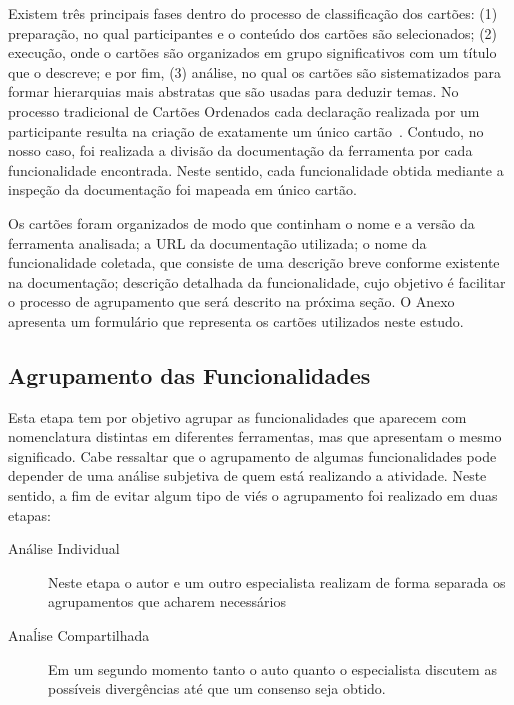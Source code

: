 Existem três principais fases dentro do processo de classificação dos cartões:
(1) preparação, no qual participantes e o conteúdo dos cartões são selecionados;
(2) execução, onde o cartões são organizados em grupo significativos com um
título que o descreve; e por fim, (3) análise, no qual os cartões são
sistematizados para formar hierarquias mais abstratas que são usadas para
deduzir temas. No processo tradicional de Cartões Ordenados cada declaração
realizada por um participante resulta na criação de exatamente um único
cartão~\cite{just2008towards}. Contudo, no nosso caso, foi realizada a divisão
da documentação da ferramenta por cada funcionalidade encontrada. Neste sentido,
cada funcionalidade obtida mediante a inspeção da documentação foi mapeada em
único cartão.

Os cartões foram organizados de modo que continham o nome e a versão da
ferramenta analisada; a URL da documentação utilizada; o nome da funcionalidade
coletada, que consiste de uma descrição breve conforme existente na
documentação; descrição detalhada da funcionalidade, cujo objetivo é facilitar o
processo de agrupamento que será descrito na próxima seção. O Anexo apresenta um
formulário que representa os cartões utilizados neste estudo.

\subsection{Agrupamento das Funcionalidades}
\label{subsec:agrupamento_fucionalidades}

Esta etapa tem por objetivo agrupar as funcionalidades que aparecem com
nomenclatura distintas em diferentes ferramentas, mas que apresentam o mesmo
significado. Cabe ressaltar que o agrupamento de algumas funcionalidades pode
depender de uma análise subjetiva de quem está realizando a atividade. Neste
sentido, a fim de evitar algum tipo de viés o agrupamento foi realizado em duas
etapas:

\begin{description}
	\item[Análise Individual] Neste etapa o autor e um outro especialista
		realizam de forma separada os agrupamentos que acharem necessários
	\item[Anaĺise Compartilhada] Em um segundo momento tanto o auto quanto o
		especialista discutem as possíveis divergências até que um consenso seja
		obtido.
\end{description}

